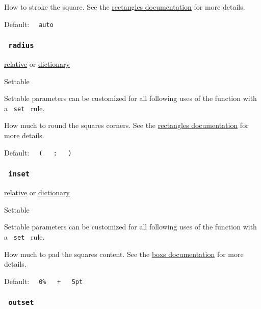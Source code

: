 How to stroke the square. See the
\href{/docs/reference/visualize/rect/\#parameters-stroke}{rectangle\textquotesingle s
documentation} for more details.

Default: \texttt{\ }{\texttt{\ auto\ }}\texttt{\ }

\subsubsection{\texorpdfstring{\texttt{\ radius\ }}{ radius }}\label{parameters-radius}

\href{/docs/reference/layout/relative/}{relative} {or}
\href{/docs/reference/foundations/dictionary/}{dictionary}

{{ Settable }}

\label{parameters-radius-settable-tooltip}
Settable parameters can be customized for all following uses of the
function with a \texttt{\ set\ } rule.

How much to round the square\textquotesingle s corners. See the
\href{/docs/reference/visualize/rect/\#parameters-radius}{rectangle\textquotesingle s
documentation} for more details.

Default:
\texttt{\ }{\texttt{\ (\ }}\texttt{\ }{\texttt{\ :\ }}\texttt{\ }{\texttt{\ )\ }}\texttt{\ }

\subsubsection{\texorpdfstring{\texttt{\ inset\ }}{ inset }}\label{parameters-inset}

\href{/docs/reference/layout/relative/}{relative} {or}
\href{/docs/reference/foundations/dictionary/}{dictionary}

{{ Settable }}

\label{parameters-inset-settable-tooltip}
Settable parameters can be customized for all following uses of the
function with a \texttt{\ set\ } rule.

How much to pad the square\textquotesingle s content. See the
\href{/docs/reference/layout/box/\#parameters-inset}{box\textquotesingle s
documentation} for more details.

Default:
\texttt{\ }{\texttt{\ 0\%\ }}\texttt{\ }{\texttt{\ +\ }}\texttt{\ }{\texttt{\ 5pt\ }}\texttt{\ }

\subsubsection{\texorpdfstring{\texttt{\ outset\ }}{ outset }}\label{parameters-outset}

